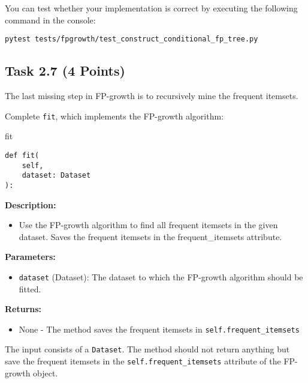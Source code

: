 \documentclass[
english,
smallborders
]{i6prcsht}
\newcommand{\points}[1]{\hfill \color{red}(#1 Points)\color{black}}
\begin{document}
You can test whether your implementation is correct by executing the following command in the console:

\vspace*{0.3cm}

\begin{lstlisting}
pytest tests/fpgrowth/test_construct_conditional_fp_tree.py
\end{lstlisting}

\newpage

\subsection*{Task 2.7 \points{4}}

The last missing step in FP-growth is to recursively mine the frequent itemsets.

Complete \texttt{fit}, which implements the FP-growth algorithm:

\vspace*{0.3cm}

\begin{functionbox}{fit}
	\begin{lstlisting}[numbers=none]
def fit(
    self, 
    dataset: Dataset
):
\end{lstlisting}
	
	\textbf{Description:}
	\begin{itemize}[leftmargin=*,topsep=0pt]
		\item Use the FP-growth algorithm to find all frequent itemsets in the given dataset. Saves the frequent itemsets in the frequent\_itemsets attribute.
	\end{itemize}
	
	\textbf{Parameters:}
	\begin{itemize}[leftmargin=*,topsep=0pt]
		\item \texttt{dataset} (Dataset): The dataset to which the FP-growth algorithm should be fitted.
	\end{itemize}
	
	\textbf{Returns:}
	\begin{itemize}[leftmargin=*,topsep=0pt]
		\item None - The method saves the frequent itemsets in \texttt{self.frequent\_itemsets}
	\end{itemize}
\end{functionbox}

\vspace*{0.5cm}

The input consists of a \texttt{Dataset}. The method should not return anything but save the frequent itemsets in the \texttt{self.frequent\_itemsets} attribute of the FP-growth object.
\end{document}

